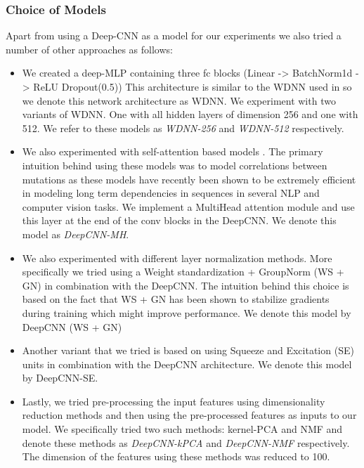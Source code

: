 \documentclass{article}
\begin{document}
\subsubsection{Choice of Models}
Apart from using a Deep-CNN as a model for our experiments we also tried a number of other approaches as follows:
\begin{itemize}
  \item We created a deep-MLP containing three fc blocks (Linear -> BatchNorm1d -> ReLU 
  Dropout(0.5))
  This architecture is similar to the WDNN used in \cite{CHEN2019356} so we denote this network architecture as WDNN. We
  experiment with two variants of WDNN. One with all hidden layers of dimension 256 and one with 512. We refer
  to these models as \emph{WDNN-256} and \emph{WDNN-512} respectively.
  \item We also experimented with self-attention based models \cite{vaswani2017attention}. The primary intuition behind using these models
  was to model correlations between mutations as these models have recently been shown to be extremely
  efficient in modeling long term dependencies in sequences in several NLP and computer vision tasks.
  We implement
  a MultiHead attention module and use this layer at the end of the conv blocks in the DeepCNN. We denote
  this model as \emph{DeepCNN-MH}.
  \item We also experimented with different layer normalization methods. More specifically we tried
  using a Weight standardization \cite{qiao2020microbatch} + GroupNorm \cite{wu2018group} (WS + GN) in combination with the DeepCNN. The intuition behind
  this choice is based on the fact that WS + GN has been shown to stabilize gradients during training
  which might improve performance. We denote this model by DeepCNN (WS + GN)
  \item Another variant that we tried is based on using Squeeze and Excitation \cite{hu2019squeezeandexcitation} (SE) units in combination
  with the DeepCNN architecture. We denote this model by DeepCNN-SE.
  \item Lastly, we tried pre-processing the input features using dimensionality reduction
  methods and then using the pre-processed features as inputs to our model.
  We specifically tried two such methods: kernel-PCA and NMF and denote these methods as \emph{DeepCNN-kPCA} and 
  \emph{DeepCNN-NMF} respectively. The dimension of the features using these methods was reduced to 100.

\end{itemize}
\end{document}
